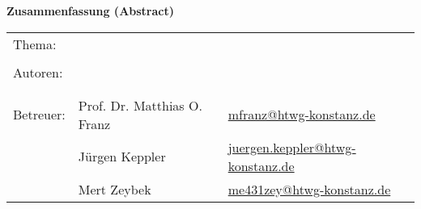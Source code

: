 
\begin{center}
{\Large \textbf{Zusammenfassung (Abstract)}}
\end{center}

\bigskip

\begin{center}
	\begin{tabular}{p{2.8cm}p{5cm}p{5cm}}
		Thema: & \multicolumn{2}{p{10cm}}{\raggedright\strTopic} \\
		 & & \\
		Autoren: & \strAuthorA & \href{mailto:\strAuthorAEmail}{\strAuthorAEmail} \\
		 & \strAuthorB & \href{mailto:\strAuthorBEmail}{\strAuthorBEmail} \\
		 & & \\
		Betreuer: & Prof. Dr. Matthias O. Franz & \href{mailto:mfranz@htwg-konstanz.de}{mfranz@htwg-konstanz.de} \\
		 &  Jürgen Keppler & \href{mailto:juergen.keppler@htwg-konstanz.de}{juergen.keppler@htwg-konstanz.de} \\
		 &  Mert Zeybek & \href{mailto:me431zey@htwg-konstanz.de}{me431zey@htwg-konstanz.de} \\
	\end{tabular}
\end{center}

\bigskip

\noindent
\strAbstract

\thispagestyle{preface}



